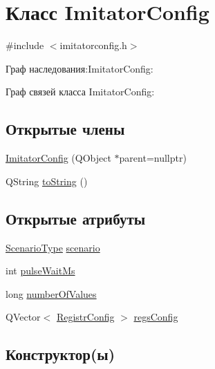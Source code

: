 \hypertarget{class_imitator_config}{}\section{Класс Imitator\+Config}
\label{class_imitator_config}


{\ttfamily \#include $<$imitatorconfig.\+h$>$}



Граф наследования\+:Imitator\+Config\+:


Граф связей класса Imitator\+Config\+:
\subsection*{Открытые члены}
\begin{DoxyCompactItemize}
\item 
\hyperlink{class_imitator_config_a35eb33f2c93491a47d9c335c8b8acada}{Imitator\+Config} (Q\+Object $\ast$parent=nullptr)
\item 
Q\+String \hyperlink{class_imitator_config_a9a7e924e7d7706b156c2c4d94c4c87d6}{to\+String} ()
\end{DoxyCompactItemize}
\subsection*{Открытые атрибуты}
\begin{DoxyCompactItemize}
\item 
\hyperlink{_random_types_8h_ae8f073eec97d33cf9783ecbe50531dfd}{Scenario\+Type} \hyperlink{class_imitator_config_ab57ad3c191f203408cf5b1d30bf1481d}{scenario}
\item 
int \hyperlink{class_imitator_config_afa9028cc41247558a86121463e67d087}{pulse\+Wait\+Ms}
\item 
long \hyperlink{class_imitator_config_ab38e9be50f825a7d11c99ad93a5c9685}{number\+Of\+Values}
\item 
Q\+Vector$<$ \hyperlink{class_registr_config}{Registr\+Config} $>$ \hyperlink{class_imitator_config_a13decc56a73e9256fedc088cd3e2ff81}{regs\+Config}
\end{DoxyCompactItemize}


\subsection{Конструктор(ы)}
\mbox{\label{class_imitator_config_a35eb33f2c93491a47d9c335c8b8acada}} 
